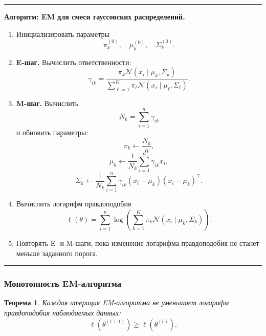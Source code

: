 \documentclass[12pt,a4paper]{article}
\newtheorem{theorem}{Теорема}[section]
\theoremstyle{definition}
\theoremstyle{remark}
\newenvironment{algorithmbox}[1]
{
    \begin{center}
    \begin{minipage}{0.96\textwidth}
    \hrule
    \medskip
    \textbf{Алгоритм: #1.}
    \par\smallskip
}
{
    \medskip
    \hrule
    \end{minipage}
    \end{center}
}
\begin{document}
\begin{algorithmbox}{EM для смеси гауссовских распределений}
\begin{enumerate}
    \item Инициализировать параметры
          \[
              \pi_k^{(0)},\quad
              \mu_k^{(0)},\quad
              \Sigma_k^{(0)}.
          \]
    \item \textbf{E-шаг.} Вычислить ответственности:
          \[
              \gamma_{ik}
              =
              \frac{
                  \pi_k
                  \mathcal{N}(x_i\mid\mu_k,\Sigma_k)
              }{
                  \sum_{\ell=1}^{K}
                  \pi_\ell
                  \mathcal{N}(x_i\mid\mu_\ell,\Sigma_\ell)
              }.
          \]
    \item \textbf{M-шаг.} Вычислить
          \[
              N_k=\sum_{i=1}^{n}\gamma_{ik}
          \]
          и обновить параметры:
          \[
              \pi_k
              \leftarrow
              \frac{N_k}{n},
          \]
          \[
              \mu_k
              \leftarrow
              \frac{1}{N_k}
              \sum_{i=1}^{n}\gamma_{ik}x_i,
          \]
          \[
              \Sigma_k
              \leftarrow
              \frac{1}{N_k}
              \sum_{i=1}^{n}
              \gamma_{ik}
              (x_i-\mu_k)(x_i-\mu_k)^\top.
          \]
    \item Вычислить логарифм правдоподобия
          \[
              \ell(\theta)
              =
              \sum_{i=1}^{n}
              \log
              \left(
                  \sum_{k=1}^{K}
                  \pi_k
                  \mathcal{N}(x_i\mid\mu_k,\Sigma_k)
              \right).
          \]
    \item Повторять E- и M-шаги, пока изменение логарифма правдоподобия
          не станет меньше заданного порога.
\end{enumerate}
\end{algorithmbox}

\subsubsection{Монотонность EM-алгоритма}

\begin{theorem}
Каждая итерация EM-алгоритма не уменьшает логарифм правдоподобия наблюдаемых
данных:
\[
    \ell(\theta^{(t+1)})
    \geq
    \ell(\theta^{(t)}).
\]
\end{theorem}
\end{document}
